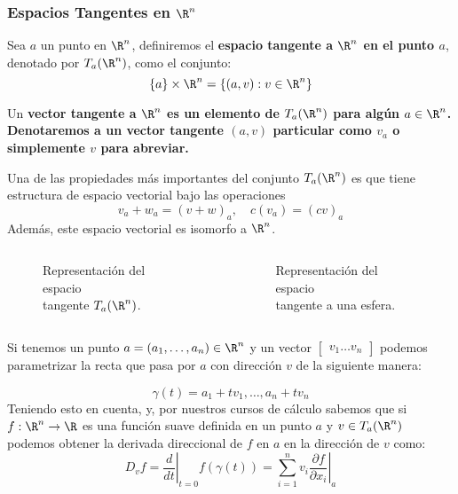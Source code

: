\begin{frame}
\frametitle{Espacios Tangentes en $\R^n$}
\begin{definition}\label{Definición: Espacio Tangente en Rn}
Sea $a$ un punto en $\R^n$, definiremos el \textbf{espacio tangente a $\R^n$ en el punto $a$}, denotado por $T_a(\R^n)$, como el conjunto:
  \[ \{a\} \times \R^n = \{(a,v): v \in \R^n\} \]
  
  Un \bf{vector tangente} a $\R^n$ es un elemento de $T_a(\R^n)$ para algún $a \in \R^n$. Denotaremos a un vector tangente $(a,v)$ particular como $v_a$ o simplemente $v$ para abreviar.
\end{definition}\pause

  Una de las propiedades más importantes del conjunto $T_a(\R^n)$ es que tiene estructura de espacio vectorial bajo las operaciones
  \[v_a + w_a = (v+w)_a, \quad c(v_a) = (cv)_a\]
  Además, este espacio vectorial es isomorfo a $\R^n$.
\end{frame}

\begin{frame}
\begin{columns}[t]
\centering
  \begin{figure}
    \centering
    \scalebox{0.75}{}
    \caption{Representación del espacio \\ tangente $T_a(\R^n)$.}
  \end{figure}
\centering
  \begin{figure}
    \centering
    \scalebox{0.65}{}
    \caption{Representación del espacio \\ tangente a una esfera.}
  \end{figure}
\end{columns}
\end{frame}

\begin{frame}
  Si tenemos un punto $a = (a_1, \dots, a_n) \in \R^n$ y un vector $\begin{bmatrix} v_1 \dots v_n \end{bmatrix}$ podemos parametrizar la recta que pasa por $a$ con dirección $v$ de la siguiente manera:

  \[\gamma(t) = a_1 + tv_1, \dots, a_n + tv_n \]
  \pause
  Teniendo esto en cuenta, y, por nuestros cursos de cálculo sabemos que si $f: \R^n \to \R$ es una función suave definida en un punto $a$ y $v \in T_a(\R^n)$ podemos obtener la derivada direccional de $f$ en $a$ en la dirección de $v$ como:
  \[
    D_v f = \left. \frac{d}{dt}\right|_{t=0} f(\gamma(t)) 
    = \sum_{i=1}^{n} v_i \left. \frac{\partial f}{\partial x_i} \right|_{a}
  \]
\end{frame}


